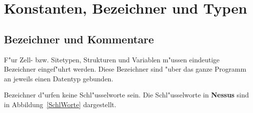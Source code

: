 \chapter{Konstanten, Bezeichner und Typen}
\label{Konstanten}

\section{Bezeichner und Kommentare}

F"ur Zell- bzw. Sitetypen, Strukturen und Variablen m"ussen eindeutige
Bezeichner eingef"uhrt werden.  Diese
Bezeichner sind "uber das ganze Programm an jeweils
einen Datentyp gebunden.

\label{Namen}

Bezeichner d"urfen keine Schl"usselworte
 sein. Die Schl"usselworte in
{\bf Nessus} sind in Abbildung~\ref{SchlWorte} dargestellt.


